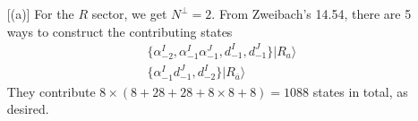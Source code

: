 \documentclass[11pt]{article}
\begin{document}
\begin{enumerate} [(a)]
    For the $R$ sector, we get $N^\perp = 2$. From Zweibach's 14.54, there are 5 ways to construct the contributing states
    \begin{align*}
        \{\alpha_{-2}^I, \alpha_{-1}^I \alpha_{-1}^J, d_{-1}^I, d_{-1}^J \} |R_a \rangle \\
        \{ \alpha_{-1}^I d_{-1}^J, d_{-2}^I \}  |R_{\overline{a}} \rangle 
    \end{align*}
    They contribute $8 \times (8 + 28 + 28 + 8\times8 + 8) = 1088$ states in total, as desired. 
\end{enumerate}
\end{document}
